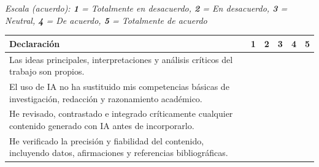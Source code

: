 


\noindent
\textit{Escala (acuerdo): \textbf{1} = Totalmente en desacuerdo,  \textbf{2} = En desacuerdo, \textbf{3} = Neutral, \textbf{4} = De acuerdo, \textbf{5} = Totalmente de acuerdo}

\begin{center}
  \small
  \setlength{\tabcolsep}{0.3cm}
  \begin{longtable}{|p{11cm}|c|c|c|c|c|}
    \hline
    \textbf{Declaración} & \textbf{1} & \textbf{2} & \textbf{3} & \textbf{4} & \textbf{5} \\
    \hline
    \endhead
    \hline
    \endfoot

    Las ideas principales, interpretaciones y análisis críticos del trabajo son propios. & & & & &  \\
    \hline

    El uso de IA no ha sustituido mis competencias básicas de investigación, redacción y razonamiento académico. &  &  &  &  &  \\
    \hline

    He revisado, contrastado e integrado críticamente cualquier contenido generado con IA antes de incorporarlo. &  &  &  &  &  \\
    \hline

    He verificado la precisión y fiabilidad del contenido, incluyendo datos, afirmaciones y referencias bibliográficas. &  &  &  &  &  \\
    \hline

  \end{longtable}
\end{center}




\flushleft

\vspace{0.5cm}

